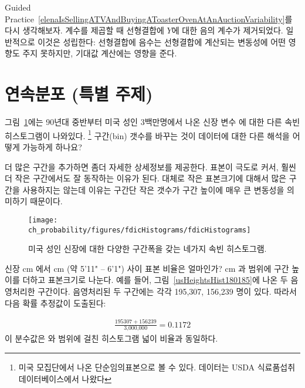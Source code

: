 Guided Practice~\ref{elenaIsSellingATVAndBuyingAToasterOvenAtAnAuctionVariability}를 다시 생각해보자. 계수를 제곱할 때 선형결합에 $Y$에 대한 음의 계수가 제거되었다. 일반적으로 이것은 성립한다: 선형결합에 음수는 선형결합에 계산되는 변동성에 어떤 영향도 주지 못하지만, 기대값 계산에는 영향을 준다.


\section{연속분포 (특별 주제)}
\label{contDist}


\begin{example}{

그림~\ref{fdicHistograms}에는 90년대 중반부터 미국 성인 3백만명에서 나온 신장 변수 에 대한 다른 속빈 히스토그램이 나와있다.
\footnote{ 미국 모집단에서 나온 단순임의표본으로 볼 수 있다. 데이터는 USDA 식료품섭취 데이터베이스에서 나왔다} 
구간(bin) 갯수를 바꾸는 것이 데이터에 대한 다른 해석을 어떻게 가능하게 하나요?}\label{usHeights}
더 많은 구간을 추가하면 좀더 자세한 상세정보를 제공한다. 표본이 극도로 커서, 훨씬 더 작은 구간에서도 잘 동작하는 이유가 된다. 대체로 작은 표본크기에 대해서 많은 구간을 사용하지는 않는데 이유는 구간단 작은 갯수가 구간 높이에 매우 큰 변동성을 의미하기 때문이다.
\end{example}

\begin{figure}[ht]
\centering
\texttt{[image: ch\_probability/figures/fdicHistograms/fdicHistograms]}
\caption{미국 성인 신장에 대한 다양한 구간폭을 갖는 네가지 속빈 히스토그램.}
\label{fdicHistograms}
\end{figure}

\begin{example}{
신장  cm 에서  cm (약 5'11" -- 6'1") 사이 표본 비율은 얼마인가?}\label{contDistProb}
 cm 과  범위에 구간 높이를 더하고 표본크기로 나눈다. 예를 들어, 그림~\ref{usHeightsHist180185}에 나온 두 음영처리한 구간이다. 음영처리된 두 구간에는 각각 195,307, 156,239 명이 있다. 따라서 다음 확률 추정값이 도출된다:

\begin{eqnarray*}
\frac{195307+156239}{\text{3,000,000}} = 0.1172
\end{eqnarray*}
이 분수값은  와  범위에 걸친 히스토그램 넓이 비율과 동일하다.
\end{example}

